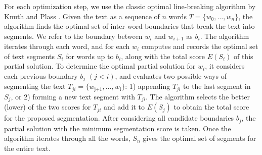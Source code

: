 For each optimization step, we use the classic optimal line-breaking algorithm by Knuth and Plass \cite{knuth1981breaking}. Given the text as a sequence of $n$ words $T = \{w_0,\dots,w_n\}$, the algorithm finds the optimal set of inter-word
boundaries that break the text into segments. We refer to the boundary between $w_i$ and $w_{i+1}$ as
$b_i$.
%
The algorithm iterates through each word, and for each $w_i$
computes and records the optimal set of text segments $S_i$ for words up to $b_i$, along with the total score $E(S_i)$ of
this partial solution. To determine the optimal partial solution for $w_i$, it
considers each previous boundary $b_j$ $(j<i)$, and evaluates two possible ways of
segmenting the text $T_{ji} = \{w_\text{j+1},
\dots,w_\text{i}\}$: 1) appending $T_{ji}$ to the last segment in $S_j$, or 2) forming a new text segment with $T_{ji}$. The algorithm selects the better (lower) of the two scores for $T_{ji}$ and add it
to $E(S_j)$ to obtain the total score for the proposed
segmentation. After considering all candidate boundaries $b_j$, the partial solution with the minimum segmentation score is taken. Once the algorithm iterates through all the words, $S_n$ gives the
optimal set of segments for the entire text. 

